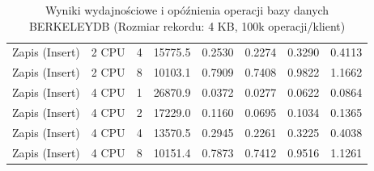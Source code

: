 \begin{table}[ht]
{\begin{tabular}{llcrrrrr}
Zapis (Insert) & 2 CPU & 4 & 15775.5 & 0.2530 & 0.2274 & 0.3290 & 0.4113 \\
Zapis (Insert) & 2 CPU & 8 & 10103.1 & 0.7909 & 0.7408 & 0.9822 & 1.1662 \\
Zapis (Insert) & 4 CPU & 1 & 26870.9 & 0.0372 & 0.0277 & 0.0622 & 0.0864 \\
Zapis (Insert) & 4 CPU & 2 & 17229.0 & 0.1160 & 0.0695 & 0.1034 & 0.1365 \\
Zapis (Insert) & 4 CPU & 4 & 13570.5 & 0.2945 & 0.2261 & 0.3225 & 0.4038 \\
Zapis (Insert) & 4 CPU & 8 & 10151.4 & 0.7873 & 0.7412 & 0.9516 & 1.1261 \\
\bottomrule
\end{tabular}%
}
\caption{Wyniki wydajnościowe i opóźnienia operacji bazy danych BERKELEYDB (Rozmiar rekordu: 4 KB, 100k operacji/klient)}
\label{tab:latency_berkeleydb_medium_100000}
\end{table}
